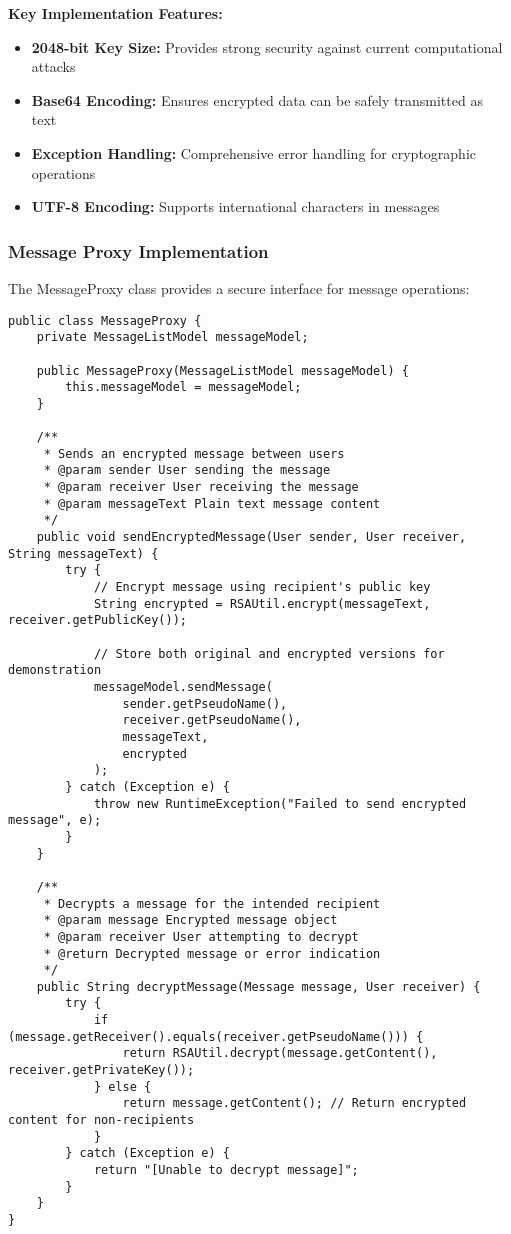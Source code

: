 \documentclass[12pt,a4paper]{article}
\begin{document}
\textbf{Key Implementation Features:}
\begin{itemize}
    \item \textbf{2048-bit Key Size:} Provides strong security against current computational attacks
    \item \textbf{Base64 Encoding:} Ensures encrypted data can be safely transmitted as text
    \item \textbf{Exception Handling:} Comprehensive error handling for cryptographic operations
    \item \textbf{UTF-8 Encoding:} Supports international characters in messages
\end{itemize}

\subsubsection{Message Proxy Implementation}

The MessageProxy class provides a secure interface for message operations:

\begin{lstlisting}[caption=Message Proxy Security Implementation]
public class MessageProxy {
    private MessageListModel messageModel;

    public MessageProxy(MessageListModel messageModel) {
        this.messageModel = messageModel;
    }

    /**
     * Sends an encrypted message between users
     * @param sender User sending the message
     * @param receiver User receiving the message
     * @param messageText Plain text message content
     */
    public void sendEncryptedMessage(User sender, User receiver, String messageText) {
        try {
            // Encrypt message using recipient's public key
            String encrypted = RSAUtil.encrypt(messageText, receiver.getPublicKey());

            // Store both original and encrypted versions for demonstration
            messageModel.sendMessage(
                sender.getPseudoName(),
                receiver.getPseudoName(),
                messageText,
                encrypted
            );
        } catch (Exception e) {
            throw new RuntimeException("Failed to send encrypted message", e);
        }
    }

    /**
     * Decrypts a message for the intended recipient
     * @param message Encrypted message object
     * @param receiver User attempting to decrypt
     * @return Decrypted message or error indication
     */
    public String decryptMessage(Message message, User receiver) {
        try {
            if (message.getReceiver().equals(receiver.getPseudoName())) {
                return RSAUtil.decrypt(message.getContent(), receiver.getPrivateKey());
            } else {
                return message.getContent(); // Return encrypted content for non-recipients
            }
        } catch (Exception e) {
            return "[Unable to decrypt message]";
        }
    }
}
\end{lstlisting}
\end{document}
